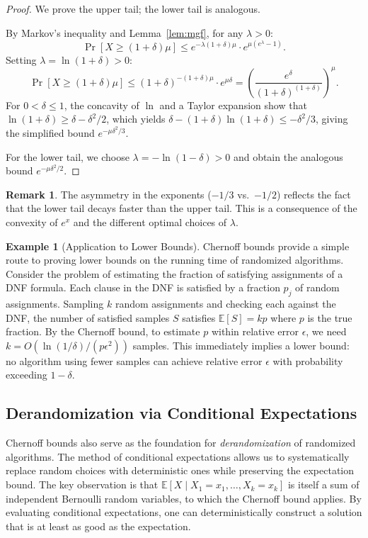 \documentclass[twoside,12pt]{book}
\theoremstyle{plain}
\theoremstyle{definition}
\newtheorem{example}[theorem]{Example}
\newtheorem{remark}[theorem]{Remark}
\theoremstyle{remark}
\begin{document}
\begin{proof}
We prove the upper tail; the lower tail is analogous.

By Markov's inequality and Lemma~\ref{lem:mgf}, for any $\lambda > 0$:
\[
\Pr[X \geq (1+\delta)\mu] \leq
e^{-\lambda(1+\delta)\mu} \cdot e^{\mu(e^{\lambda}-1)}.
\]
Setting $\lambda = \ln(1+\delta) > 0$:
\[
\Pr[X \geq (1+\delta)\mu] \leq
(1+\delta)^{-(1+\delta)\mu} \cdot e^{\mu\delta} =
\left(\frac{e^{\delta}}{(1+\delta)^{(1+\delta)}}\right)^{\!\mu}.
\]
For $0 < \delta \leq 1$, the concavity of $\ln$ and a Taylor expansion
show that $\ln(1+\delta) \geq \delta - \delta^2/2$, which yields
$\delta - (1+\delta)\ln(1+\delta) \leq -\delta^2/3$, giving the simplified
bound $e^{-\mu\delta^2/3}$.

For the lower tail, we choose $\lambda = -\ln(1-\delta) > 0$ and obtain
the analogous bound $e^{-\mu\delta^2/2}$.
\end{proof}

\begin{remark}
The asymmetry in the exponents ($-1/3$ vs.\ $-1/2$) reflects the fact
that the lower tail decays faster than the upper tail. This is a
consequence of the convexity of $e^x$ and the different optimal choices
of $\lambda$.
\end{remark}

\begin{example}[Application to Lower Bounds]
\label{ex:chernoff-lower}
Chernoff bounds provide a simple route to proving lower bounds on the
running time of randomized algorithms. Consider the problem of estimating
the fraction of satisfying assignments of a DNF formula. Each clause in
the DNF is satisfied by a fraction $p_j$ of random assignments. Sampling
$k$ random assignments and checking each against the DNF, the number of
satisfied samples $S$ satisfies $\mathbb{E}[S] = kp$ where $p$ is the
true fraction. By the Chernoff bound, to estimate $p$ within relative
error $\epsilon$, we need $k = O(\ln(1/\delta)/(p\epsilon^2))$ samples.
This immediately implies a lower bound: no algorithm using fewer samples
can achieve relative error $\epsilon$ with probability exceeding $1 -
\delta$.
\end{example}

\subsection{Derandomization via Conditional Expectations}

Chernoff bounds also serve as the foundation for \emph{derandomization}
of randomized algorithms. The method of conditional expectations allows
us to systematically replace random choices with deterministic ones while
preserving the expectation bound. The key observation is that
$\mathbb{E}[X \mid X_1 = x_1, \ldots, X_k = x_k]$ is itself a sum of
independent Bernoulli random variables, to which the Chernoff bound
applies. By evaluating conditional expectations, one can deterministically
construct a solution that is at least as good as the expectation.
\end{document}
